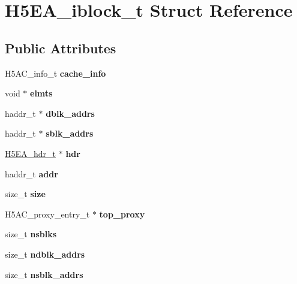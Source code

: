 \hypertarget{struct_h5_e_a__iblock__t}{}\section{H5\+E\+A\+\_\+iblock\+\_\+t Struct Reference}
\label{struct_h5_e_a__iblock__t}
\subsection*{Public Attributes}
\begin{DoxyCompactItemize}
\item 
\mbox{\label{struct_h5_e_a__iblock__t_a86e9e25caa8a0df0b5618cdf8a6bab5c}} 
H5\+A\+C\+\_\+info\+\_\+t {\bfseries cache\+\_\+info}
\item 
\mbox{\label{struct_h5_e_a__iblock__t_a9540035e1430c44aba67a3b781832a57}} 
void $\ast$ {\bfseries elmts}
\item 
\mbox{\label{struct_h5_e_a__iblock__t_aa0f778aaf93e9195f1a8caa8b1e48e42}} 
haddr\+\_\+t $\ast$ {\bfseries dblk\+\_\+addrs}
\item 
\mbox{\label{struct_h5_e_a__iblock__t_aff803a53b912096b397dd2be37241670}} 
haddr\+\_\+t $\ast$ {\bfseries sblk\+\_\+addrs}
\item 
\mbox{\label{struct_h5_e_a__iblock__t_aacfd9dbf1b1c9b33dad831b9cf65d206}} 
\hyperlink{struct_h5_e_a__hdr__t}{H5\+E\+A\+\_\+hdr\+\_\+t} $\ast$ {\bfseries hdr}
\item 
\mbox{\label{struct_h5_e_a__iblock__t_a9dbcfe7f1d12bce597b5c05dfd4e72e9}} 
haddr\+\_\+t {\bfseries addr}
\item 
\mbox{\label{struct_h5_e_a__iblock__t_afc55afc39f5df67b4b217dffa1c7a3cd}} 
size\+\_\+t {\bfseries size}
\item 
\mbox{\label{struct_h5_e_a__iblock__t_a0ff6b0db9c2fbbc7283d6bd63ad90442}} 
H5\+A\+C\+\_\+proxy\+\_\+entry\+\_\+t $\ast$ {\bfseries top\+\_\+proxy}
\item 
\mbox{\label{struct_h5_e_a__iblock__t_a68324c845fdfeaec78a49dfa28816ec4}} 
size\+\_\+t {\bfseries nsblks}
\item 
\mbox{\label{struct_h5_e_a__iblock__t_a1429f7685f5dd992fa15c97965f3095e}} 
size\+\_\+t {\bfseries ndblk\+\_\+addrs}
\item 
\mbox{\label{struct_h5_e_a__iblock__t_a99a47d3c8afb6b377ce203f0b325ee35}} 
size\+\_\+t {\bfseries nsblk\+\_\+addrs}
\end{DoxyCompactItemize}


